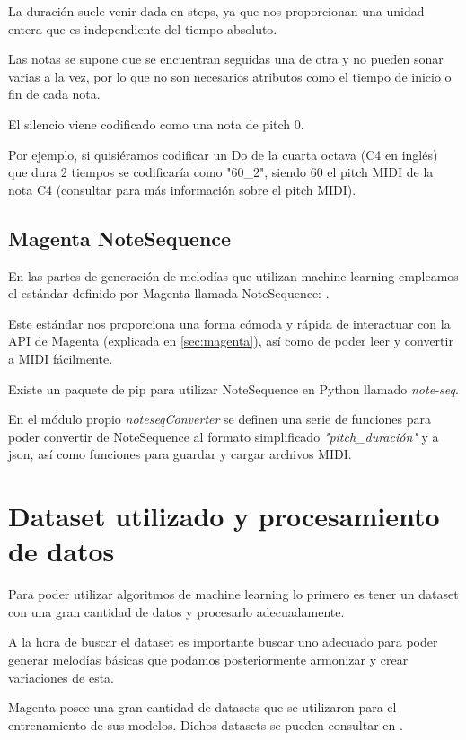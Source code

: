         La duración suele venir dada en steps, ya que nos proporcionan una unidad entera que es independiente del tiempo absoluto.

        Las notas se supone que se encuentran seguidas una de otra y no pueden sonar varias a la vez, por lo que no son necesarios atributos como el tiempo de inicio o fin de cada nota.

        El silencio viene codificado como una nota de pitch 0.

        Por ejemplo, si quisiéramos codificar un Do de la cuarta octava (C4 en inglés) que dura 2 tiempos se codificaría como "60\_2", siendo 60 el pitch MIDI de la nota C4 (consultar \cite{MIDIPitch} para más información sobre el pitch MIDI).

    \subsection{Magenta NoteSequence}
    \label{subsec:note-seq}

    
    En las partes de generación de melodías que utilizan machine learning empleamos el estándar definido por Magenta llamada NoteSequence: \cite{note-seq}. 

    Este estándar nos proporciona una forma cómoda y rápida de interactuar con la API de Magenta (explicada en \ref{sec:magenta}), así como de poder leer y convertir a MIDI fácilmente.

    Existe un paquete de pip para utilizar NoteSequence en Python llamado \textit{note-seq}.

    En el módulo propio \textit{noteseqConverter} se definen una serie de funciones para poder convertir de NoteSequence al formato simplificado \textit{"pitch\_duración"} y a json, así como funciones para guardar y cargar archivos MIDI.

\section{Dataset utilizado y procesamiento de datos}
\label{sec:dataset}
Para poder utilizar algoritmos de machine learning lo primero es tener un dataset con una gran cantidad de datos y procesarlo adecuadamente.

A la hora de buscar el dataset es importante buscar uno adecuado para poder generar melodías básicas que podamos posteriormente armonizar y crear variaciones de esta.

Magenta posee una gran cantidad de datasets que se utilizaron para el entrenamiento de sus modelos. Dichos datasets se pueden consultar en \cite{MagentaDatasets}.

